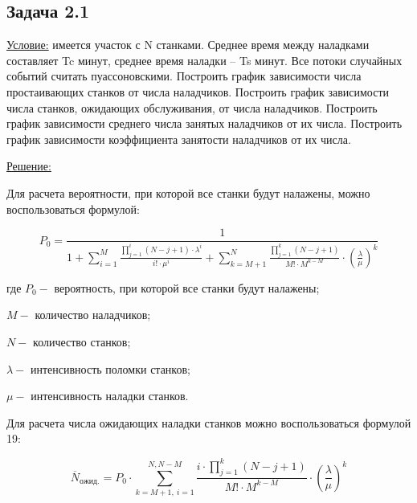 \subsection*{Задача 2.1}

\underline{Условие:} имеется участок с N станками. Среднее время между наладками составляет Tc минут, среднее время наладки – Ts минут. Все потоки случайных событий считать пуассоновскими. Построить график зависимости числа простаивающих станков от числа наладчиков. Построить график зависимости числа станков, ожидающих обслуживания, от числа наладчиков. Построить график зависимости среднего числа занятых наладчиков от их числа. Построить график зависимости коэффициента занятости наладчиков от их числа.\par

\underline{Решение:}\par

Для расчета вероятности, при которой все станки будут налажены, можно воспользоваться формулой:

\begin{equation}
    P_{0}=\frac{1}{1+ \sum _{i=1}^{M}\frac{ \prod_{j=1}^{i} \left( N-j+1 \right)  \cdot  \lambda ^{i}}{i! \cdot  \mu ^{i}}+ \sum _{k=M+1}^{N}\frac{ \prod_{j=1}^{k} \left( N-j+1 \right) }{M! \cdot M^{k-M}} \cdot  \left( \frac{ \lambda }{ \mu } \right) ^{k}}
\end{equation} 

где  \( P_{0}-  \) вероятность, при которой все станки будут налажены;\par

 \( M-  \) количество наладчиков;\par

 \( N-  \) количество станков;\par

 \(  \lambda -  \) интенсивность поломки станков;\par

 \(  \mu -  \) интенсивность наладки станков.\par

Для расчета числа ожидающих наладки станков можно воспользоваться формулой 19:\par

\begin{equation} 
    \overline{N}_{ожид.}=P_{0} \cdot  \sum _{k=M+1,~ i=1}^{N, N-M}\frac{i \cdot  \prod_{j=1}^{k} \left( N-j+1 \right) }{M! \cdot M^{k-M}} \cdot  \left( \frac{ \lambda }{ \mu } \right) ^{k} 
\end{equation} \par

